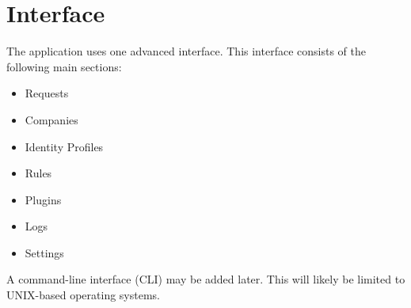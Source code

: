
\chapter{Interface}

The application uses one advanced interface. This interface consists of the following main sections:

\begin{itemize}
	\item Requests
	\item Companies
	\item Identity Profiles
	\item Rules
	\item Plugins
	\item Logs
	\item Settings
\end{itemize}

A command-line interface (CLI) may be added later. This will likely be limited to UNIX-based operating systems.

\sentinelchapterend
